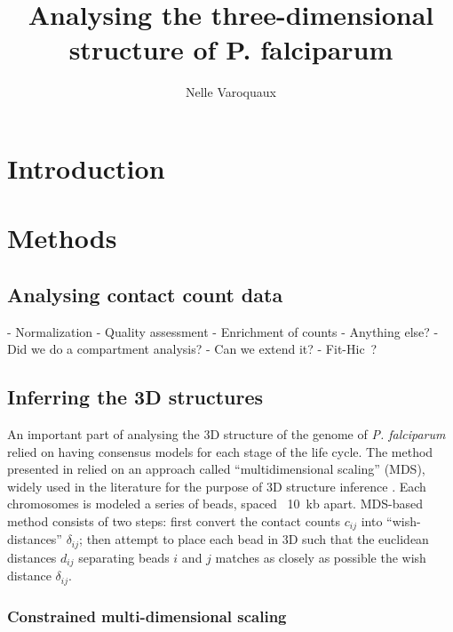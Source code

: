 \documentclass[letterpaper,12pt]{article}
\begin{document}
\title{Analysing the three-dimensional structure of P. falciparum}
\author{Nelle Varoquaux}



\begin{abstract}

\end{abstract}


\section{Introduction}
\label{sec1}


\section{Methods}
\label{sec2}


\subsection{Analysing contact count data}

- Normalization
- Quality assessment
- Enrichment of counts
- Anything else?
    - Did we do a compartment analysis?
- Can we extend it?
  - Fit-Hic ?

\subsection{Inferring the 3D structures}

An important part of analysing the 3D structure of the genome of \textit{P.
falciparum} relied on having consensus models for each stage of the life
cycle. The method presented in \citet{ay:three-dimensional} relied on an
approach called ``multidimensional scaling'' (MDS), widely used in the
literature for the purpose of 3D structure inference
\citep{duan:three-dimensional, varoquaux:statistical, bau:, tanizawa:}. Each chromosomes is
modeled a series of beads, spaced ~10~kb apart. MDS-based method consists of
two steps: first convert the
contact counts $c_{ij}$ into ``wish-distances'' $\delta_{ij}$; then attempt
to place each bead in 3D such that the euclidean distances $d_{ij}$ separating
beads $i$ and $j$ matches as closely as possible the wish distance
$\delta_{ij}$.

\subsubsection{Constrained multi-dimensional scaling}
\end{document}
